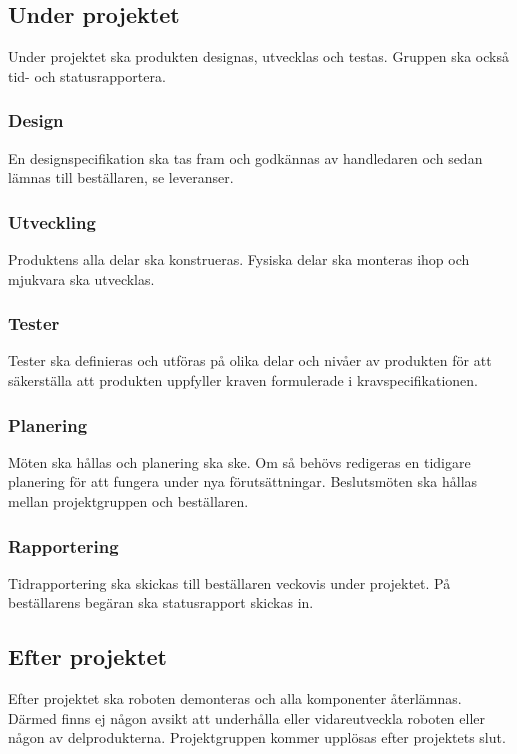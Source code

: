 \documentclass{article}
\begin{document}
\subsection{Under projektet}
Under projektet ska produkten designas, utvecklas och testas. Gruppen ska också tid- och statusrapportera.

\subsubsection{Design}
En designspecifikation ska tas fram och godkännas av handledaren och sedan lämnas till beställaren, se leveranser. 

\subsubsection{Utveckling}
Produktens alla delar ska konstrueras. Fysiska delar ska monteras ihop och mjukvara ska utvecklas.

\subsubsection{Tester}
Tester ska definieras och utföras på olika delar och nivåer av produkten för att säkerställa att produkten uppfyller kraven formulerade i kravspecifikationen.

\subsubsection{Planering}
Möten ska hållas och planering ska ske. Om så behövs redigeras en tidigare planering för att fungera under nya förutsättningar. Beslutsmöten ska hållas mellan projektgruppen och beställaren.

\subsubsection{Rapportering}
Tidrapportering ska skickas till beställaren veckovis under projektet. På beställarens begäran ska statusrapport skickas in.

\subsection{Efter projektet}
Efter projektet ska roboten demonteras och alla komponenter återlämnas. Därmed finns ej någon avsikt att underhålla eller vidareutveckla roboten eller någon av delprodukterna. Projektgruppen kommer upplösas efter projektets slut.
\end{document}
